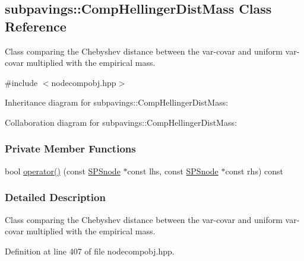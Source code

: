\hypertarget{classsubpavings_1_1CompHellingerDistMass}{\subsection{subpavings\-:\-:\-Comp\-Hellinger\-Dist\-Mass \-Class \-Reference}
\label{classsubpavings_1_1CompHellingerDistMass}
}


\-Class comparing the \-Chebyshev distance between the var-\/covar and uniform var-\/covar multiplied with the empirical mass.  




{\ttfamily \#include $<$nodecompobj.\-hpp$>$}



\-Inheritance diagram for subpavings\-:\-:\-Comp\-Hellinger\-Dist\-Mass\-:


\-Collaboration diagram for subpavings\-:\-:\-Comp\-Hellinger\-Dist\-Mass\-:
\subsubsection*{\-Private \-Member \-Functions}
\begin{DoxyCompactItemize}
\item 
bool \hyperlink{classsubpavings_1_1CompHellingerDistMass_a794cd9023bb26a82015aff89492e9cca}{operator()} (const \hyperlink{classsubpavings_1_1SPSnode}{\-S\-P\-Snode} $\ast$const lhs, const \hyperlink{classsubpavings_1_1SPSnode}{\-S\-P\-Snode} $\ast$const rhs) const 
\end{DoxyCompactItemize}


\subsubsection{\-Detailed \-Description}
\-Class comparing the \-Chebyshev distance between the var-\/covar and uniform var-\/covar multiplied with the empirical mass. 

\-Definition at line 407 of file nodecompobj.\-hpp.



